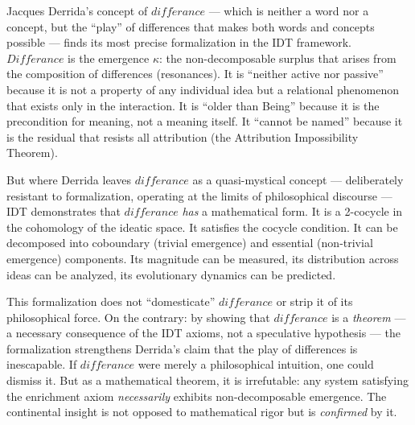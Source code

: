 \begin{interpretation}
\label{interp:ch22:derrida_final}
Jacques Derrida's concept of $diff\acute{e}rance$ --- which is neither
a word nor a concept, but the ``play'' of differences that makes both
words and concepts possible --- finds its most precise formalization
in the IDT framework.  $Diff\acute{e}rance$ is the emergence $\kappa$:
the non-decomposable surplus that arises from the composition of
differences (resonances).  It is ``neither active nor passive''
because it is not a property of any individual idea but a relational
phenomenon that exists only in the interaction.  It is ``older than
Being'' because it is the precondition for meaning, not a meaning
itself.  It ``cannot be named'' because it is the residual that resists
all attribution (the Attribution Impossibility Theorem).

But where Derrida leaves $diff\acute{e}rance$ as a quasi-mystical
concept --- deliberately resistant to formalization, operating at the
limits of philosophical discourse --- IDT demonstrates that
$diff\acute{e}rance$ \emph{has} a mathematical form.  It is a 2-cocycle
in the cohomology of the ideatic space.  It satisfies the cocycle
condition.  It can be decomposed into coboundary (trivial emergence)
and essential (non-trivial emergence) components.  Its magnitude can
be measured, its distribution across ideas can be analyzed, its
evolutionary dynamics can be predicted.

This formalization does not ``domesticate'' $diff\acute{e}rance$ or
strip it of its philosophical force.  On the contrary: by showing
that $diff\acute{e}rance$ is a \emph{theorem} --- a necessary
consequence of the IDT axioms, not a speculative hypothesis --- the
formalization strengthens Derrida's claim that the play of differences
is inescapable.  If $diff\acute{e}rance$ were merely a philosophical
intuition, one could dismiss it.  But as a mathematical theorem, it
is irrefutable: any system satisfying the enrichment axiom
\emph{necessarily} exhibits non-decomposable emergence.  The
continental insight is not opposed to mathematical rigor but is
\emph{confirmed} by it.
\end{interpretation}

